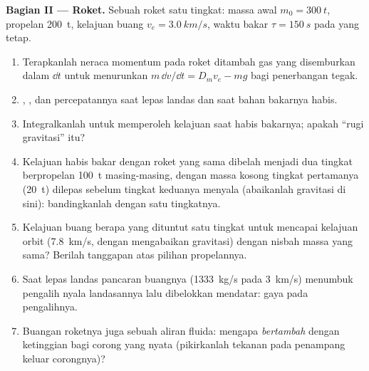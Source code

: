 \begin{problem}
\medskip
\noindent\textbf{Bagian II --- Roket.}
Sebuah roket satu tingkat: massa awal $m_0 = \qty{300}{t}$, propelan
\qty{200}{t}, kelajuan buang $v_e = \qty{3.0}{km/s}$, waktu bakar $\tau =
\qty{150}{s}$ pada  yang tetap.
\begin{enumerate}[resume]
  \item Terapkanlah neraca momentum pada roket ditambah gas yang disemburkan dalam
        $\dd t$ untuk menurunkan $m\,\dd v/\dd t = D_mv_e - mg$ bagi penerbangan
        tegak.
  \item {}, , dan percepatannya saat lepas landas dan
        saat bahan bakarnya habis.
  \item Integralkanlah untuk memperoleh kelajuan saat habis bakarnya; apakah ``rugi
        gravitasi'' itu?
  \item Kelajuan habis bakar dengan roket yang sama dibelah menjadi dua tingkat
        berpropelan \qty{100}{t} masing-masing, dengan massa kosong tingkat pertamanya
        (\qty{20}{t}) dilepas sebelum tingkat keduanya menyala (abaikanlah
        gravitasi di sini): bandingkanlah dengan satu tingkatnya.
  \item Kelajuan buang berapa yang dituntut satu tingkat untuk mencapai kelajuan
        orbit (\qty{7.8}{km/s}, dengan mengabaikan gravitasi) dengan nisbah
        massa yang sama? Berilah tanggapan atas pilihan propelannya.
  \item Saat lepas landas pancaran buangnya (\qty{1333}{kg/s} pada \qty{3}{km/s}) menumbuk
        pengalih nyala landasannya lalu dibelokkan mendatar:
        gaya pada pengalihnya.
  \item Buangan roketnya juga sebuah aliran fluida: mengapa 
        \emph{bertambah} dengan ketinggian bagi corong yang nyata (pikirkanlah
        tekanan pada penampang keluar corongnya)?
\end{enumerate}


\end{problem}
